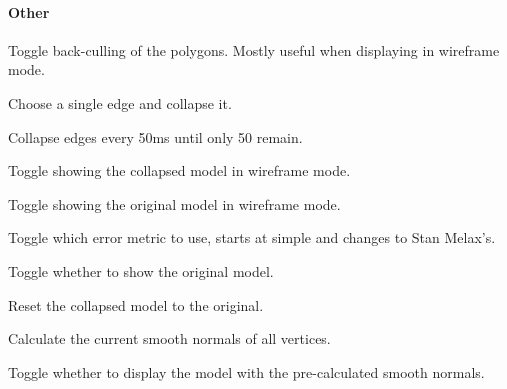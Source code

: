     \paragraph{Other}
      \begin{description}
        \setlength{\topsep}{0pt}
        \setlength{\parskip}{0pt}
        \setlength{\partopsep}{0pt}
        \setlength{\parsep}{0pt}
        \setlength{\itemsep}{0pt}

        \item[B]{ Toggle back-culling of the polygons.  Mostly useful when
        displaying in wireframe mode. }

        \item[X]{ Choose a single edge and collapse it. }

        \item[Q]{ Collapse edges every 50ms until only 50%
        remain. }

        \item[E]{ Toggle showing the collapsed model in wireframe mode. }

        \item[R]{ Toggle showing the original model in wireframe mode. }

        \item[F]{ Toggle which error metric to use, starts at simple and changes
        to Stan Melax's. }

        \item[T]{ Toggle whether to show the original model. }

        \item[P]{ Reset the collapsed model to the original. }

        \item[K]{ Calculate the current smooth normals of all vertices. }

        \item[L]{ Toggle whether to display the model with the pre-calculated
        smooth normals. }

      \end{description}
